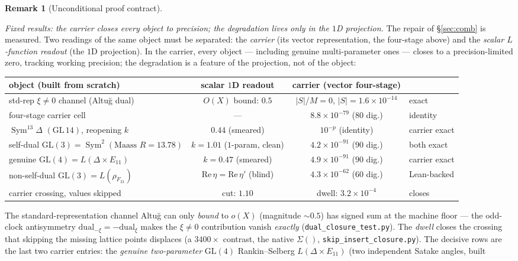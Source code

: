 \documentclass[11pt]{article}
\theoremstyle{definition}
\newtheorem{remark}[theorem]{Remark}
\newcommand{\Sym}{\operatorname{Sym}}
\begin{document}
\begin{remark}[Unconditional proof contract]
\begin{enumerate}
\emph{Fixed results: the carrier closes every object to precision; the degradation lives only in the $1$D
projection.} The repair of \S\ref{sec:comb} is measured. Two readings of the same object must be separated: the
\emph{carrier} (its vector representation, the four-stage above) and the \emph{scalar $L$-function readout} (the
$1$D projection). In the carrier, every object --- including genuine multi-parameter ones --- closes to a
precision-limited zero, tracking working precision; the degradation is a feature of the projection, not of the
object:
\begin{center}
\begin{tabular}{lccl}
\toprule
object (built from scratch) & scalar $1$D readout & carrier (vector four-stage) & \\
\midrule
std-rep $\xi\neq0$ channel (Altu\u{g} dual) & $O(X)$ bound: $0.5$ & $|S|/M=0$, $|S|=1.6{\times}10^{-14}$ & exact \\
four-stage carrier cell & --- & $8.8{\times}10^{-79}$ ($80$ dig.) & identity \\
$\Sym^{13}\Delta$ $(\mathrm{GL}\,14)$, reopening $k$ & $0.44$ (smeared) & $10^{-p}$ (identity) & carrier exact \\
self-dual $\mathrm{GL}(3)=\Sym^2(\text{Maass }R{=}13.78)$ & $k=1.01$ ($1$-param, clean) & $4.2{\times}10^{-91}$ ($90$ dig.) & both exact \\
genuine $\mathrm{GL}(4)=L(\Delta\times E_{11})$ & $k=0.47$ (smeared) & $4.9{\times}10^{-91}$ ($90$ dig.) & carrier exact \\
non-self-dual $\mathrm{GL}(3)=L(\rho_{F_{21}})$ & $\mathrm{Re}\,\eta{=}\mathrm{Re}\,\eta'$ (blind) & $4.3{\times}10^{-62}$ ($60$ dig.) & Lean-backed \\
carrier crossing, values skipped & cut: $1.10$ & dwell: $3.2{\times}10^{-4}$ & closes \\
\bottomrule
\end{tabular}
\end{center}
The standard-representation channel Altu\u{g} can only \emph{bound} to $o(X)$ (magnitude $\sim0.5$) has signed
sum at the machine floor --- the odd-clock antisymmetry $\mathrm{dual}_{-\xi}=-\mathrm{dual}_{\xi}$ makes the
$\xi\neq0$ contribution vanish \emph{exactly} (\texttt{dual\_closure\_test.py}). The \emph{dwell} closes the
crossing that skipping the missing lattice points displaces (a $3400\times$ contrast, the native $\Sigma()$,
\texttt{skip\_insert\_closure.py}). The decisive rows are the last two carrier entries: the \emph{genuine
two-parameter} $\mathrm{GL}(4)$ Rankin--Selberg $L(\Delta\times E_{11})$ (two independent Satake angles, built

\end{enumerate}
\end{remark}
\end{document}
